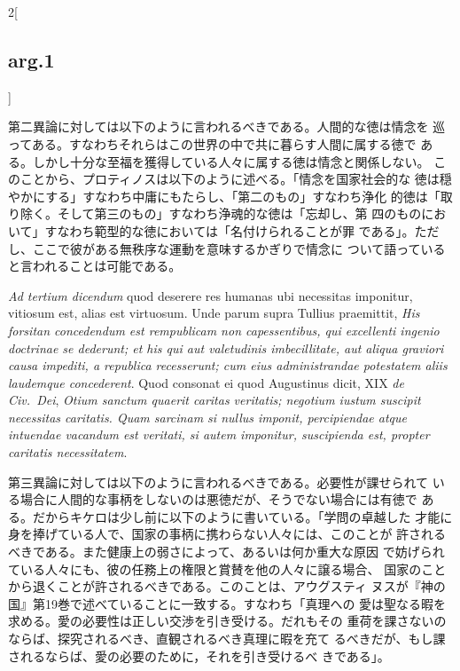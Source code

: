 \documentclass[paper=a4paper,fontsize=10pt,jafontsize=9pt,titlepage]{jlreq}
\begin{document}
\begin{paracol}{2}[\subsection{arg.1}]
\switchcolumn

第二異論に対しては以下のように言われるべきである。人間的な徳は情念を
 巡ってある。すなわちそれらはこの世界の中で共に暮らす人間に属する徳で
 ある。しかし十分な至福を獲得している人々に属する徳は情念と関係しない。
 このことから、プロティノスは以下のように述べる。「情念を国家社会的な
 徳は穏やかにする」すなわち中庸にもたらし、「第二のもの」すなわち浄化
 的徳は「取り除く。そして第三のもの」すなわち浄魂的な徳は「忘却し、第
 四のものにおいて」すなわち範型的な徳においては「名付けられることが罪
 である」。ただし、ここで彼がある無秩序な運動を意味するかぎりで情念に
 ついて語っていると言われることは可能である。

\switchcolumn*[\subsection{ad.3}]

{\itshape Ad tertium dicendum} quod deserere res humanas ubi
necessitas imponitur, vitiosum est, alias est virtuosum. Unde parum
supra Tullius praemittit, {\itshape His forsitan concedendum est
rempublicam non capessentibus, qui excellenti ingenio doctrinae se
dederunt; et his qui aut valetudinis imbecillitate, aut aliqua
graviori causa impediti, a republica recesserunt; cum eius
administrandae potestatem aliis laudemque concederent}. Quod consonat
ei quod Augustinus dicit, XIX {\itshape de Civ.~Dei}, {\itshape Otium
sanctum quaerit caritas veritatis; negotium iustum suscipit necessitas
caritatis. Quam sarcinam si nullus imponit, percipiendae atque
intuendae vacandum est veritati, si autem imponitur, suscipienda est,
propter caritatis necessitatem}.

\switchcolumn

第三異論に対しては以下のように言われるべきである。必要性が課せられて
 いる場合に人間的な事柄をしないのは悪徳だが、そうでない場合には有徳で
 ある。だからキケロは少し前に以下のように書いている。「学問の卓越した
 才能に身を捧げている人で、国家の事柄に携わらない人々には、このことが
 許されるべきである。また健康上の弱さによって、あるいは何か重大な原因
 で妨げられている人々にも、彼の任務上の権限と賞賛を他の人々に譲る場合、
 国家のことから退くことが許されるべきである。このことは、アウグスティ
 ヌスが『神の国』第19巻で述べていることに一致する。すなわち「真理への
 愛は聖なる暇を求める。愛の必要性は正しい交渉を引き受ける。だれもその
 重荷を課さないのならば、探究されるべき、直観されるべき真理に暇を充て
 るべきだが、もし課されるならば、愛の必要のために，それを引き受けるべ
 きである」。


\end{paracol}
\end{document}
